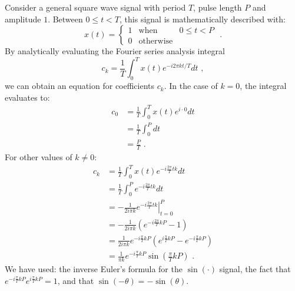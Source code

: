 Consider a general square wave signal with period $T$, pulse length $P$ and amplitude $1$. Between $0\le t < T$, this signal is mathematically described with:
\begin{equation}
x(t) = \left\{ \begin{array}{ccl}
1 & \mathrm{when} & 0 \le t < P \\
0 & \mathrm{otherwise} & 
\end{array}
\right. \,\,.
\end{equation}
By analytically evaluating the Fourier series analysis integral
\begin{equation}
c_k = \frac{1}{T}\int_0^T x(t) e^{-i 2\pi k t/T} dt \,\,,
\end{equation}
we can obtain an equation for coefficients $c_k$. In the case of $k=0$, the integral evaluates to:
\begin{align}
c_0 & = \frac{1}{T}\int_0^{T} x(t) e^{i\cdot 0}dt\\
    & = \frac{1}{T}\int_0^{P}  dt \\
    & = \frac{P}{T} \,\,.\label{eq:pulsecoeff0}
\end{align}
For other values of $k\ne 0$:
\begin{align}
c_k & = \frac{1}{T}\int_0^{T} x(t) e^{-i\frac{2\pi}{T} t k}dt\\
 & =  \frac{1}{T}\int_0^{P}  e^{-i\frac{2\pi}{T} t k}dt \\
 & = \left.-\frac{1 }{2i \pi k}e^{-i\frac{2\pi}{T}  t k}\right\vert_{t=0}^{P} \\
 & = -\frac{1}{2i\pi k}\left(e^{-i\frac{2\pi}{T}  k P} - 1\right)\\
 & = \frac{1}{2i\pi k}e^{-i\frac{\pi}{T}  k P}\left(e^{i \frac{\pi}{T} kP} - e^{-i \frac{\pi}{T} kP} \right)\\
& =  \frac{1}{\pi k}e^{-i\frac{\pi}{T}  k P}\sin\left(\frac{\pi}{T} kP\right) \,\,.\label{eq:pulsecoeff1}
\end{align}
We have used: the inverse Euler's formula for the $\sin(\cdot)$ signal, the fact that $e^{-i\frac{\pi}{T} k P}e^{i\frac{\pi}{T} k P}=1$, and that $\sin(-\theta)=-\sin(\theta)$. 

